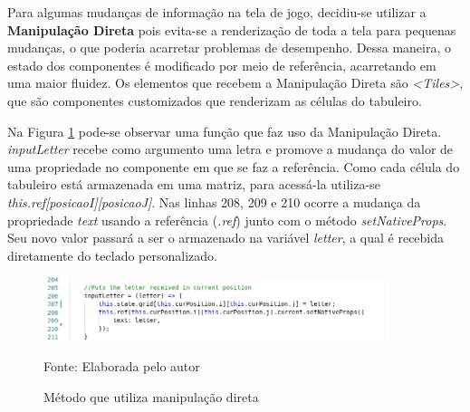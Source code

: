 Para algumas mudanças de informação na tela de jogo, decidiu-se utilizar a \textbf{Manipulação Direta} pois evita-se a renderização de toda a tela para pequenas mudanças, o que poderia acarretar problemas de desempenho. Dessa maneira, o estado dos componentes é modificado por meio de referência, acarretando em uma maior fluidez. Os elementos que recebem a Manipulação Direta são \textit{<Tiles>}, que são componentes customizados que renderizam as células do tabuleiro. 

Na Figura \ref{fig:codeDirectManipulation} pode-se observar uma função que faz uso da Manipulação Direta. \textit{inputLetter} recebe como argumento uma letra e promove a mudança do valor de uma propriedade no componente em que se faz a referência. Como cada célula do tabuleiro está armazenada em uma matriz, para acessá-la utiliza-se \textit{this.ref[posicaoI][posicaoJ]}. Nas linhas 208, 209 e 210 ocorre a mudança da propriedade \textit{text} usando a referência (\textit{.ref}) junto com o método \textit{setNativeProps}. Seu novo valor passará a ser o armazenado na variável \textit{letter}, a qual é recebida diretamente do teclado personalizado.

\begin{figure}[H]
\centering
    \caption{Método que utiliza manipulação direta}
    \label{fig:codeDirectManipulation}
    \includegraphics[width=0.9\textwidth]{Figuras/codeDirectManipulation.png}
    
    Fonte: Elaborada pelo autor
\end{figure}


